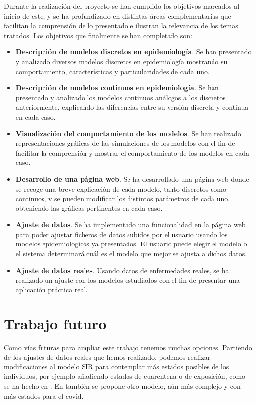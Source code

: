 Durante la realización del proyecto se han cumplido los objetivos marcados al inicio de este, y se ha profundizado en distintas áreas complementarias que facilitan la comprensión de lo presentado e ilustran la relevancia de los temas tratados. Los objetivos que finalmente se han completado son:

\begin{itemize}
\item \textbf{Descripción de modelos discretos en epidemiología}. Se han presentado y analizado diversos modelos discretos en epidemiología mostrando su comportamiento, características y particularidades de cada uno.
\item \textbf{Descripción de modelos continuos en epidemiología}. Se han presentado y analizado los modelos continuos análogos a los discretos anteriormente, explicando las diferencias entre su versión discreta y continua en cada caso.
\item \textbf{Visualización del comportamiento de los modelos}. Se han realizado representaciones gráficas de las simulaciones de los modelos con el fin de facilitar la comprensión y mostrar el comportamiento de los modelos en cada caso.
\item \textbf{Desarrollo de una página web}. Se ha desarrollado una página web donde se recoge una breve explicación de cada modelo, tanto discretos como continuos, y se pueden modificar los distintos parámetros de cada uno, obteniendo las gráficas pertinentes en cada caso.
\item \textbf{Ajuste de datos}. Se ha implementado una funcionalidad en la página web para poder ajustar ficheros de datos subidos por el usuario usando los modelos epidemiológicos ya presentados. El usuario puede elegir el modelo o el sistema determinará cuál es el modelo que mejor se ajusta a dichos datos.
\item \textbf{Ajuste de datos reales}. Usando datos de enfermedades reales, se ha realizado un ajuste con los modelos estudiados con el fin de presentar una aplicación práctica real.
\end{itemize}

\section{Trabajo futuro}

Como vías futuras para ampliar este trabajo tenemos muchas opciones. Partiendo de los ajustes de datos reales que hemos realizado, podemos realizar modificaciones al modelo SIR para contemplar más estados posibles de los individuos, por ejemplo añadiendo estados de cuarentena o de exposición, como se ha hecho en \cite{gutierrez2020analisis}. En \cite{RAMOS2021105937} también se propone otro modelo, aún más complejo y con más estados para el covid.

